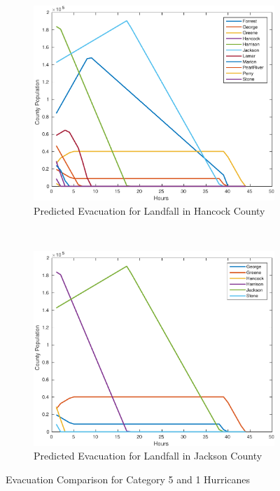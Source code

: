 \documentclass[titlepage]{article}
\begin{document}
    \begin{figure}
      \center
      \begin{subfigure}[b]{0.5\textwidth}
        \center
        \includegraphics[width=\linewidth]{figures/pred_hancock-crop.pdf}
        \caption{Predicted Evacuation for Landfall in Hancock County}
        \label{fig:stochastic_out_large}
      \end{subfigure}~
      \begin{subfigure}[b]{0.5\textwidth}
        \center
        \includegraphics[width=\linewidth]{figures/pred_jackson-crop.pdf}
        \caption{Predicted Evacuation for Landfall in Jackson County}
        \label{fig:stochastic_out_small}
      \end{subfigure}
      \caption{Evacuation Comparison for Category 5 and 1 Hurricanes}
      \label{fig:stochastic_out}
    \end{figure}
\end{document}
